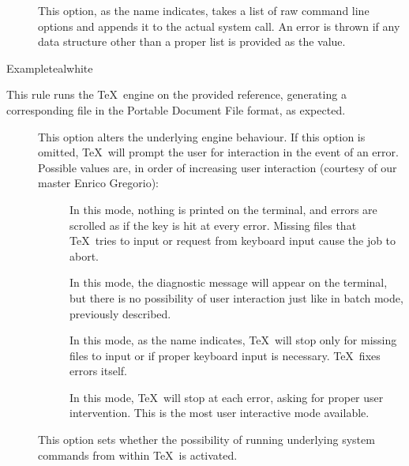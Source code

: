 \begin{description}
\begin{description}
\item[] This option, as the name indicates, takes a list of raw command line options and appends it to the actual system call. An error is thrown if any data structure other than a proper list is provided as the value.
\end{description}

\begin{codebox}{Example}{teal}{\icnote}{white}
\end{codebox}

\item[\rulebox{xetex}{Marco Daniel, Paulo Cereda}] This rule runs the  \TeX\ engine on the provided  reference, generating a corresponding file in the Portable Document File format, as expected.

\begin{description}
\item[] This option alters the underlying engine behaviour. If this option is omitted, \TeX\ will prompt the user for interaction in the event of an error. Possible values are, in order of increasing user interaction (courtesy of our master Enrico Gregorio):

\begin{description}
\item[] In this mode, nothing is printed on the terminal, and errors are scrolled as if the  key is hit at every error. Missing files that \TeX\ tries to input or request from keyboard input cause the job to abort.

\item[] In this mode, the diagnostic message will appear on the terminal, but there is no possibility of user interaction just like in batch mode, previously described.

\item[] In this mode, as the name indicates, \TeX\ will stop only for missing files to input or if proper keyboard input is necessary. \TeX\ fixes errors itself.

\item[] In this mode, \TeX\ will stop at each error, asking for proper user intervention. This is the most user interactive mode available.
\end{description}

\item[] This option sets whether the possibility of running underlying system commands from within \TeX\ is activated.


\end{description}
\end{description}
